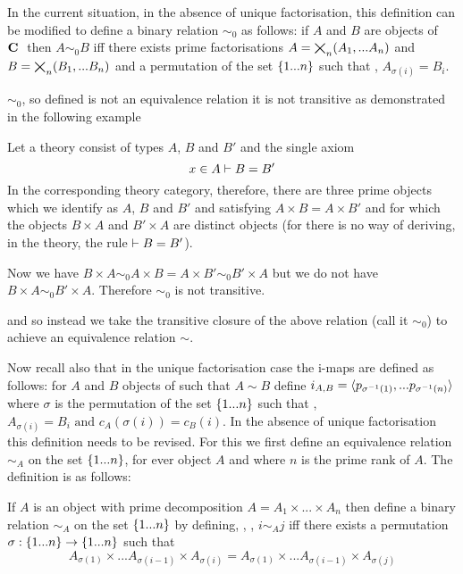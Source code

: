 \documentclass[10pt,a4paper]{scrartcl}
\begin{document}
In the current situation, in the absence of unique factorisation, this definition 
can be modified to define a binary relation $\sim_0$ as follows:
if $A$ and $B$ are objects of $\textbf{C}\ $ then $A \sim_0 B$ 
iff there exists prime factorisations 
$A = \bigtimes_{n}(A_1,...A_n)$ 
and $B= \bigtimes_{n}(B_1,...B_n)$ 
and  a permutation of the set $\left\{1...n\right\}$ such that 
\foreachi, $A_{\sigma(i)}=B_i$.

$\sim_0$, so defined is not
an equivalence relation  it is not transitive as demonstrated in the following example
\begin{notebox}[Example]
Let a theory consist of types $A$, $B$ and $B'$ and the single axiom 
\begin{equation}
x \in A \vdash B=B'
\end{equation}
In the corresponding theory category, therefore, there are three prime objects which
we identify as $A$, $B$ and $B'$ and satisfying $A \times B = A \times B'$ and 
for which the objects $B \times A$ and $B' \times A$ are distinct objects (for there is no way of deriving, in the theory, the rule $\vdash B = B'$). 

Now we have $B \times A \sim_0 A \times B = A \times B' \sim_0 B' \times A$
but we do not have $B \times A \sim_0 B' \times A$. Therefore $\sim_0$ is not transitive.
\end{notebox}
and so instead we take the transitive closure of the above relation (call it $\sim_0$) to
achieve an equivalence relation $\sim$.

Now recall also that in the unique factorisation case the i-maps are defined as follows:
for $A$ and $B$ objects of \catcw such that $A\sim B$ define $i_{A,B}=\langle p_{\sigma^{-1}(1)},...p_{\sigma^{-1}(n)}\rangle$ where $\sigma$ is the permutation of the set $\left\{1...n\right\}$ 
such that \foreachi, $A_{\sigma(i)}=B_i \mbox{ and }  c_A(\sigma(i)) = c_B(i)$.  In the absence of unique factorisation this definition needs to be revised. For this 
we first define an equivalence relation $\sim_A$ on the set $\left\{1...n\right\}$, for ever object $A$
and where $n$ is the prime rank of $A$. The definition is as follows:
\begin{definition}
If $A$ is an object with prime decomposition $A=A_1 \times ... \times A_n$ then define
a binary relation $\sim_A$ on the set $\left\{1...n\right\}$ by defining, \foreachi, \foreachj,
$i \sim_A j$  iff  there exists a permutation $\sigma: \left\{1...n\right\} \rightarrow \left\{1...n\right\}$ such that
$$A_{\sigma(1)}\times...A_{\sigma(i-1)}\times A_{\sigma(i)} = A_{\sigma(1)}\times...A_{\sigma(i-1)}\times A_{\sigma(j)} $$
\end{definition}
\end{document}
